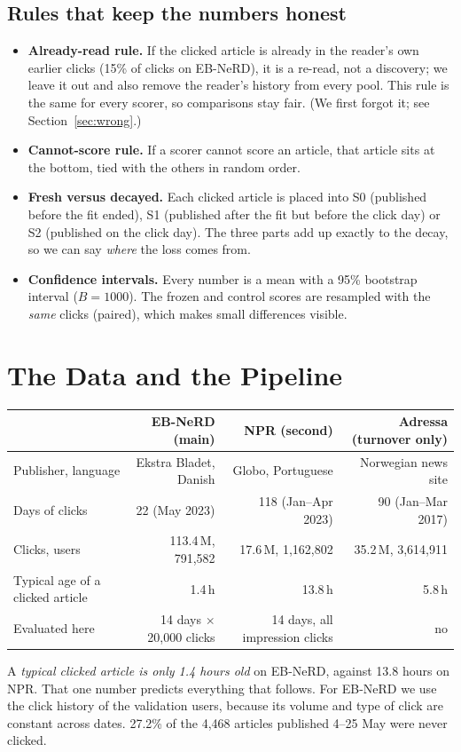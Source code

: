 \documentclass[11pt,a4paper]{article}
\newcommand{\term}[1]{\textbf{#1}}
\begin{document}
\subsection{Rules that keep the numbers honest}
\begin{itemize}
\item \term{Already-read rule.} If the clicked article is already in the reader's own earlier clicks (15\% of clicks on EB-NeRD), it is a re-read, not a discovery; we leave it out and also remove the reader's history from every pool. This rule is the same for every scorer, so comparisons stay fair. (We first forgot it; see Section~\ref{sec:wrong}.)
\item \term{Cannot-score rule.} If a scorer cannot score an article, that article sits at the bottom, tied with the others in random order.
\item \term{Fresh versus decayed.} Each clicked article is placed into S0 (published before the fit ended), S1 (published after the fit but before the click day) or S2 (published on the click day). The three parts add up exactly to the decay, so we can say \emph{where} the loss comes from.
\item \term{Confidence intervals.} Every number is a mean with a 95\% bootstrap interval ($B=1000$). The frozen and control scores are resampled with the \emph{same} clicks (paired), which makes small differences visible.
\end{itemize}

\section{The Data and the Pipeline}
\begin{center}\small
\begin{tabular}{@{}lrrr@{}}
\toprule
 & \textbf{EB-NeRD} (main) & \textbf{NPR} (second) & \textbf{Adressa} (turnover only)\\
\midrule
Publisher, language & Ekstra Bladet, Danish & Globo, Portuguese & Norwegian news site\\
Days of clicks & 22 (May 2023) & 118 (Jan--Apr 2023) & 90 (Jan--Mar 2017)\\
Clicks, users & 113.4\,M, 791,582 & 17.6\,M, 1,162,802 & 35.2\,M, 3,614,911\\
Typical age of a clicked article & 1.4\,h & 13.8\,h & 5.8\,h\\
Evaluated here & 14 days $\times$ 20,000 clicks & 14 days, all impression clicks & no\\
\bottomrule
\end{tabular}
\end{center}
A \emph{typical clicked article is only 1.4 hours old} on EB-NeRD, against 13.8 hours on NPR. That one number predicts everything that follows. For EB-NeRD we use the click history of the validation users, because its volume and type of click are constant across dates. 27.2\% of the 4,468 articles published 4--25 May were never clicked.
\end{document}
